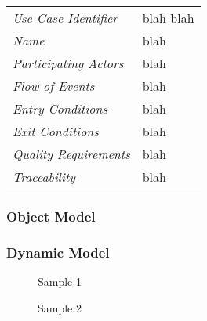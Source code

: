 \documentclass[12pt,letterpaper]{article}
\begin{document}
{\renewcommand{\arraystretch}{1.5}
\everyrow{\hline}
\begin{tabu} to 
\toprule
Use Case Identifier & blah blah \\
Name & blah \\
Participating Actors & blah \\
Flow of Events & blah \\
Entry Conditions & blah \\
Exit Conditions & blah \\
Quality Requirements & blah \\
Traceability & blah \\
\toprule
\end{tabu}}

\subsubsection{Object Model}


\subsubsection{Dynamic Model}

\begin{figure}[H]
\protect\caption{Sample 1}


\end{figure}


\begin{figure}[H]
\protect\caption{Sample 2}


\end{figure}
\end{document}
